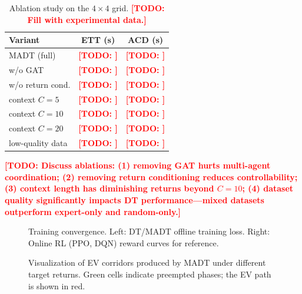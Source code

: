\documentclass[journal]{IEEEtran}
\newcommand{\todo}[1]{\textcolor{red}{\textbf{[TODO: #1]}}}
\begin{document}
\begin{table}[t]
  \centering
  \caption{Ablation study on the $4\times4$ grid.
    \todo{Fill with experimental data.}}
  \label{tab:ablation}
  \begin{tabular}{lcc}
    \toprule
    \textbf{Variant} & \textbf{ETT (s)} & \textbf{ACD (s)} \\
    \midrule
    MADT (full)              & \todo{} & \todo{} \\
    \quad w/o GAT            & \todo{} & \todo{} \\
    \quad w/o return cond.   & \todo{} & \todo{} \\
    \quad context $C = 5$    & \todo{} & \todo{} \\
    \quad context $C = 10$   & \todo{} & \todo{} \\
    \quad context $C = 20$   & \todo{} & \todo{} \\
    \quad low-quality data   & \todo{} & \todo{} \\
    \bottomrule
  \end{tabular}
\end{table}

\todo{Discuss ablations:  (1) removing GAT hurts multi-agent
coordination; (2) removing return conditioning reduces controllability;
(3) context length has diminishing returns beyond $C=10$;
(4) dataset quality significantly impacts DT performance---mixed
datasets outperform expert-only and random-only.}

\begin{figure}[t]
  \centering
  \caption{Training convergence.  Left: DT/MADT offline training loss.
    Right: Online RL (PPO, DQN) reward curves for reference.}
  \label{fig:learning}
\end{figure}

\begin{figure}[t]
  \centering
  \caption{Visualization of EV corridors produced by MADT under
    different target returns.  Green cells indicate preempted phases;
    the EV path is shown in red.}
  \label{fig:corridor_vis}
\end{figure}
\end{document}
